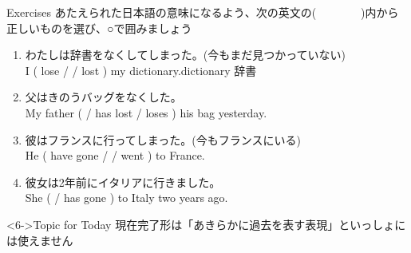 \documentclass[aspectratio=169,xcolor={dvipsnames,table}]{beamer}
\newcommand{\myaudio}[1]{\href{#1}{\faVolumeUp}}
\begin{document}
\begin{frame}[plain]{Exercises}
 あたえられた日本語の意味になるよう、次の英文の(~~~~~~~~)内から正しいものを選び、○で囲みましょう%
\mbox{}\hfill{\scriptsize \myaudio{./audio/014_have_pp_kekka_05.mp3}}


\begin{enumerate}
 \item {\small わたしは辞書をなくしてしまった。}{\footnotesize (今もまだ見つかっていない)}\\
I  ( lose /  / lost ) my dictionary.\hfill{\scriptsize dictionary  辞書}
 \item {\small 父はきのうバッグをなくした。\textdbend}\\
My father (  / has lost / loses ) his bag yesterday.
 \item {\small 彼はフランスに行ってしまった。}{\footnotesize (今もフランスにいる)}\\
He ( have gone / / went  ) to France.
 \item {\small 彼女は2年前にイタリアに行きました。\textdbend}\\
She (  / has gone ) to Italy two years ago.
\end{enumerate}

\begin{block}<6->{Topic for Today}\small
 現在完了形は「あきらかに過去を表す表現」といっしょには使えません\textdbend
\end{block}
\end{frame}
\end{document}
